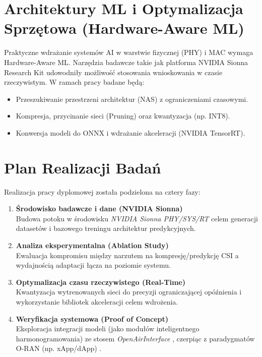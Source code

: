 \documentclass[12pt, a4paper]{article}
\begin{document}
\section{Architektury ML i Optymalizacja Sprzętowa (Hardware-Aware ML)}
Praktyczne wdrażanie systemów AI w warstwie fizycznej (PHY) i MAC wymaga Hardware-Aware ML. Narzędzia badawcze takie jak platforma NVIDIA Sionna Research Kit \cite{youtube-sionna} udowodniły możliwość stosowania wnioskowania w czasie rzeczywistym. W ramach pracy badane będą:
\begin{itemize}
    \item Przeszukiwanie przestrzeni architektur (NAS) z ograniczeniami czasowymi.
    \item Kompresja, przycinanie sieci (Pruning) oraz kwantyzacja (np. INT8).
    \item Konwersja modeli do ONNX i wdrażanie akceleracji (NVIDIA TensorRT).
\end{itemize}

\section{Plan Realizacji Badań}
Realizacja pracy dyplomowej została podzielona na cztery fazy:

\begin{enumerate}[label=\textbf{Faza \arabic*:}, leftmargin=*]
    \item \textbf{Środowisko badawcze i dane (NVIDIA Sionna)}\\
    Budowa potoku w środowisku \textit{NVIDIA Sionna PHY/SYS/RT} \cite{sionna-phy, sionna-sys, sionna-rt} celem generacji datasetów i bazowego treningu architektur predykcyjnych.
    
    \item \textbf{Analiza eksperymentalna (Ablation Study)}\\
    Ewaluacja kompromisu między narzutem na kompresję/predykcję CSI a wydajnością adaptacji łącza na poziomie systemu.
    
    \item \textbf{Optymalizacja czasu rzeczywistego (Real-Time)}\\
    Kwantyzacja wytrenowanych sieci do precyzji ograniczającej opóźnienia i wykorzystanie bibliotek akceleracji celem wdrożenia.
    
    \item \textbf{Weryfikacja systemowa (Proof of Concept)}\\
    Eksploracja integracji modeli (jako modułów inteligentnego harmonogramowania) ze stosem \textit{OpenAirInterface} \cite{oai}, czerpiąc z paradygmatów O-RAN (np. xApp/dApp) \cite{rg-dapps}.
\end{enumerate}
\end{document}
